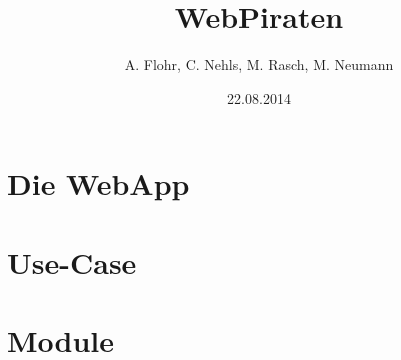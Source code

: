 \documentclass{beamer}
\begin{document}

\title{WebPiraten}  
\author{A. Flohr, C. Nehls, M. Rasch,  M. Neumann}
\date{22.08.2014} 

\begin{frame}
\maketitle
\end{frame} 



\section{Die WebApp}

\section{Use-Case}

\section{Module}





\end{document}
